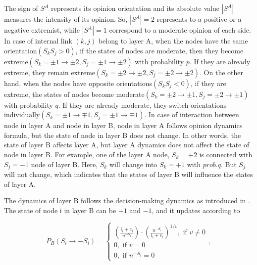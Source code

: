 \documentclass[review]{elsarticle}
\begin{document}
The sign of $S^A$ represents its opinion orientation and its absolute value $|S^A|$ measures the intensity of its opinion. So, $|S^A|=2$ represents to a positive or a negative extremist, while  $|S^A|=1$ correspond to a moderate opinion of each side. In case of internal link $(k, j)$ belong to layer A, when the nodes have the same orientation$(S_kS_j>0)$, if the states of nodes are moderate, then they become extreme$(S_k=\pm1 \rightarrow \pm2, S_j= \pm1 \rightarrow \pm2)$ with probability $p$. If they are already extreme, they remain extreme$(S_k=\pm2 \rightarrow \pm2, S_j= \pm2 \rightarrow \pm2)$. On the other hand, when the nodes have opposite orientations$(S_kS_j<0)$, if they are extreme, the states of nodes become moderate$(S_k=\pm2 \rightarrow \pm1, S_j= \pm2 \rightarrow \pm1)$ with probability $q$. If they are already moderate, they switch orientations individually$(S_k=\pm1 \rightarrow \mp1, S_j= \pm1 \rightarrow \mp1)$.  In case of interaction between node in layer A and node in layer B, node in layer A follows opinion dynamics formula, but the state of node in layer B does not change. In other words, the state of layer B affects layer A, but layer A dynamics does not affect the state of node in layer B. For example, one of the layer A node, $S_k = +2$ is connected with  $S_j = -1$ node of layer B. Here, $S_k$ will change into $S_k = +1$ with $prob.q$. But $S_j$ will not change, which indicates that the states of layer B will influence the states of layer A.

The dynamics of layer B follows the decision-making dynamics as introduced in \cite{abrams2003, vazquez2010}. The state of node i in layer B can be $+1$ and $-1$, and it updates according to

\begin{equation}
{P_B}({S_i} \to  - {S_i}) = \begin{cases}
{\left({\displaystyle\frac{{{i_i} + {e_i}}}{{{n^{ - {S_i}}}}}}\right)}{\cdot}{\left({\displaystyle\frac{{n^{-{S_i}}}}{{{i_i} + {e_i}}}} \right)^{1/v}}  ,\mbox{ if } v \ne 0\\
0,\mbox{ if } v = 0\\
0,\mbox{ if } {n^{ - {S_i}}} = 0
\end{cases},
\end{equation}
\end{document}
